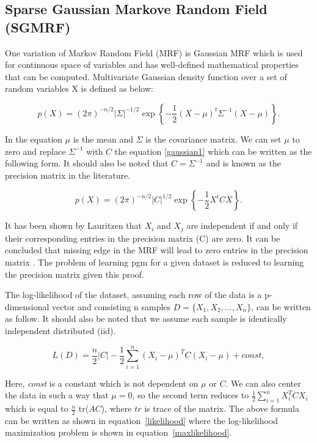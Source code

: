 \documentclass{article} %
\begin{document}
\subsection{Sparse Gaussian Markove Random Field (SGMRF)}
One variation of Markov Random Field (MRF) is Gaussian MRF which is 
used for continuous space of variables and has well-defined mathematical 
properties that can be computed. Multivariate Gaussian density function 
over a set of random variables X is defined as below: 

\begin{equation}\label{gaussian1}
p(X) = (2\pi)^{-n/2} |\Sigma|^{-1/2} \exp\left\{ -\frac{1}{2}(X - \mu)^t \Sigma^{-1} (X - \mu) \right\}.
\end{equation}
 
In the equation $\mu$ is the mean and $\Sigma$ is the covariance matrix. 
We can set $\mu$ to zero and replace $\Sigma^{-1}$ with $C$ the 
equation \eqref{gaussian1} which can be written as the following form. 
It should also be noted that $C = \Sigma^{-1}$ and is known as the 
precision matrix in the literature.  

\begin{equation}\label{gaussian2}
p(X) = (2\pi)^{-n/2} |C|^{1/2} \exp\left\{ -\frac{1}{2}X^t C X \right\}.
\end{equation}

It has been shown by Lauritzen \cite{lauritzen1996graphical} that $X_i$ and $X_j$ are 
independent if and only if their corresponding entries in the precision 
matrix (C) are zero. It can be concluded that missing edge in the MRF will 
lead to zero entries in the precision matrix \cite{Rish2014Book}. The problem 
of learning pgm for a given dataset is reduced to 
learning the precision matrix given this proof.

The log-likelihood of the dataset, assuming each row of the data is a
p-dimensional vector and consisting n samples $D = \{X_1, X_2, ... , X_n\}$, 
can be written as follow. It should also be noted that we assume each sample 
is identically independent distributed (iid).

\begin{equation}
L(D) = \frac{n}{2} |C| - \frac{1}{2} \sum_{i=1}^{n} (X_i - \mu )^T C (X_i - \mu ) + const,
\end{equation}  

Here, \textit{const} is a constant which is not dependent on $\mu$ or $C$. We can also 
center the data in such a way that $\mu = 0$, so the second term reduces to 
$\frac{1}{2} \sum_{i=1}^{n} X_i ^T C X_i$ which is equal to 
$\frac{n}{2}$ tr($AC$), where $tr$ is trace of the matrix. The above 
formula can be written as shown in equation~\eqref{likelihood} where the
log-likelihood maximization problem is shown in 
equation~\eqref{maxlikelihood}. 
\end{document}
